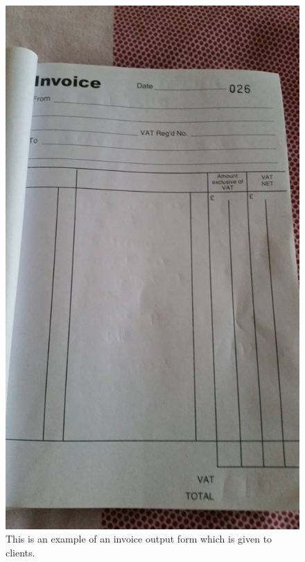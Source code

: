 \begin{figure}[H]
    \includegraphics[width=\textwidth]{./Analysis/images/invoice.jpg}
    \caption{This is an example of an invoice output form which is given to clients.} \label{fig:invoice}
\end{figure}

